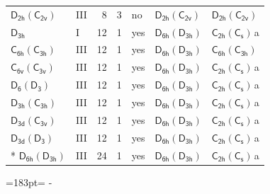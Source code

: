 \documentclass[10pt,a4paper]{article}
\newcommand{\needspace}[1]{\par\penalty-100\begingroup\dimen0=#1\relax\dimen2=\pagegoal
  \advance\dimen2-\pagetotal\ifdim\dimen0>\dimen2\relax\ifdim\dimen2>0pt\vfil\break\fi\fi
  \endgroup}
\numberwithin{equation}{section}
\newcommand{\grp}[1]{\mathsf{#1}}
\newcommand{\clsletter}[1]{\,{\scriptsize\color{black!55}#1}}
\begin{document}
{\begin{longtable}{@{}llrrlll@{}}
\href{D2h-C2v.pdf}{$\grp{D_{2h}}(\grp{C_{2v}})$} & III & 8 & 3 & no & \href{D2h-C2v.pdf}{$\grp{D_{2h}}(\grp{C_{2v}})$} & \href{D2h-C2v.pdf}{$\grp{D_{2h}}(\grp{C_{2v}})$}\\
\href{../../../rotation/data/pdf/D3h.pdf}{$\grp{D_{3h}}$} & I & 12 & 1 & yes & \href{D6h-D3h.pdf}{$\grp{D_{6h}}(\grp{D_{3h}})$} & \href{C2h-C1v.pdf}{$\grp{C_{2h}}(\grp{C_{s}})$}\clsletter{a}\\
\href{C6h-C3h.pdf}{$\grp{C_{6h}}(\grp{C_{3h}})$} & III & 12 & 1 & yes & \href{D6h-D3h.pdf}{$\grp{D_{6h}}(\grp{D_{3h}})$} & \href{C6h-C3h.pdf}{$\grp{C_{6h}}(\grp{C_{3h}})$}\\
\href{C6v-C3v.pdf}{$\grp{C_{6v}}(\grp{C_{3v}})$} & III & 12 & 1 & yes & \href{D6h-D3h.pdf}{$\grp{D_{6h}}(\grp{D_{3h}})$} & \href{C2h-C1v.pdf}{$\grp{C_{2h}}(\grp{C_{s}})$}\clsletter{a}\\
\href{D6-D3.pdf}{$\grp{D_{6}}(\grp{D_{3}})$} & III & 12 & 1 & yes & \href{D6h-D3h.pdf}{$\grp{D_{6h}}(\grp{D_{3h}})$} & \href{C2h-C1v.pdf}{$\grp{C_{2h}}(\grp{C_{s}})$}\clsletter{a}\\
\href{D3h-C3h.pdf}{$\grp{D_{3h}}(\grp{C_{3h}})$} & III & 12 & 1 & yes & \href{D6h-D3h.pdf}{$\grp{D_{6h}}(\grp{D_{3h}})$} & \href{C2h-C1v.pdf}{$\grp{C_{2h}}(\grp{C_{s}})$}\clsletter{a}\\
\href{D3d-C3v.pdf}{$\grp{D_{3d}}(\grp{C_{3v}})$} & III & 12 & 1 & yes & \href{D6h-D3h.pdf}{$\grp{D_{6h}}(\grp{D_{3h}})$} & \href{C2h-C1v.pdf}{$\grp{C_{2h}}(\grp{C_{s}})$}\clsletter{a}\\
\href{D3d-D3.pdf}{$\grp{D_{3d}}(\grp{D_{3}})$} & III & 12 & 1 & yes & \href{D6h-D3h.pdf}{$\grp{D_{6h}}(\grp{D_{3h}})$} & \href{C2h-C1v.pdf}{$\grp{C_{2h}}(\grp{C_{s}})$}\clsletter{a}\\*
\href{D6h-D3h.pdf}{$\grp{D_{6h}}(\grp{D_{3h}})$} & III & 24 & 1 & yes & \href{D6h-D3h.pdf}{$\grp{D_{6h}}(\grp{D_{3h}})$} & \href{C2h-C1v.pdf}{$\grp{C_{2h}}(\grp{C_{s}})$}\clsletter{a}\\
\bottomrule\end{longtable}}
\needspace{183pt}
\end{document}
